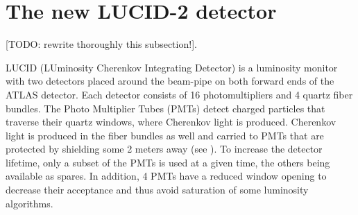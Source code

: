%    
%   
%  
% 

\section{The new LUCID-2 detector}
\label{sec:LUCID}

[TODO: rewrite thoroughly this subsection!].

LUCID (LUminosity Cherenkov Integrating Detector) is a luminosity monitor with two detectors placed around the beam-pipe on both forward ends of the ATLAS detector. 
Each detector consists of 16 photomultipliers and 4 quartz fiber bundles. The Photo Multiplier Tubes (PMTs) detect charged 
particles that traverse their quartz windows, where Cherenkov light is produced. Cherenkov light is produced in 
the fiber bundles as well and carried to PMTs that are protected by shielding some 2 meters away 
(see ). To increase the detector lifetime, only a subset of the PMTs is used at a 
given time, the others being available as spares. In addition, 4 PMTs have a reduced window opening to decrease 
their acceptance and thus avoid saturation of some luminosity algorithms.

